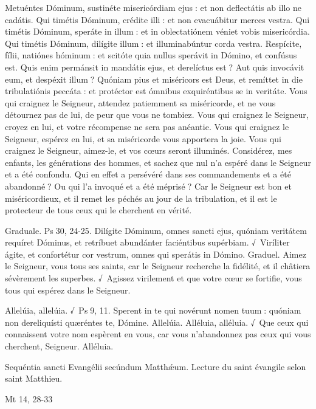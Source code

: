 \begin{paracol}{2}
Metuéntes Dóminum, sustinéte  misericórdiam ejus : et non deflectátis ab illo ne cadátis. Qui timétis Dóminum, crédite illi : et non evacuábitur merces vestra. Qui timétis Dóminum, speráte in illum : et in oblectatiónem véniet vobis misericórdia. Qui timétis Dóminum, dilígite illum : et illuminabúntur corda vestra. Respícite, fílii, natiónes hóminum : et scitóte quia nullus sperávit in Dómino, et confúsus est. Quis enim permánsit in mandátis ejus, et derelíctus est ? Aut quis invocávit eum, et despéxit illum ? Quóniam pius et miséricors est Deus, et remíttet in die tribulatiónis peccáta : et protéctor est ómnibus exquiréntibus se in veritáte.
\switchcolumn
Vous qui craignez le Seigneur,  attendez patiemment sa miséricorde, et ne vous détournez pas de lui, de peur que vous ne tombiez. Vous qui craignez le Seigneur, croyez en lui, et votre récompense ne sera pas anéantie. Vous qui craignez le Seigneur, espérez en lui, et sa miséricorde vous apportera la joie. Vous qui craignez le Seigneur, aimez-le, et vos cœurs seront illuminés. Considérez, mes enfants, les générations des hommes, et sachez que nul n’a espéré dans le Seigneur et a été confondu. Qui en effet a persévéré dans ses commandements et a été abandonné ? Ou qui l’a invoqué et a été méprisé ? Car le Seigneur est bon et miséricordieux, et il remet les péchés au jour de la tribulation, et il est le protecteur de tous ceux qui le cherchent en vérité.
\switchcolumn*

Graduale. Ps 30, 24-25. Dilígite Dóminum, omnes sancti ejus, quóniam veritátem requíret Dóminus, et retríbuet abundánter faciéntibus supérbiam. √~Viríliter ágite, et confortétur cor vestrum, omnes qui sperátis in Dómino.
\switchcolumn
Graduel. Aimez le Seigneur, vous tous ses saints, car le Seigneur recherche la fidélité, et il châtiera sévèrement les superbes. √~Agissez virilement et que votre cœur se fortifie, vous tous qui espérez dans le Seigneur.
\switchcolumn*

Allelúia, allelúia. √~Ps 9, 11. Sperent in te qui novérunt nomen tuum : quóniam non dereliquísti quæréntes te, Dómine. Allelúia.
\switchcolumn
Alléluia, alléluia. √~Que ceux qui connaissent votre nom espèrent en vous, car vous n’abandonnez pas ceux qui vous cherchent, Seigneur. Alléluia.
\switchcolumn*

Sequéntia sancti Evangélii secúndum Matthǽum.
\switchcolumn
Lecture du saint évangile selon saint Matthieu.
\switchcolumn*

Mt 14, 28-33
\switchcolumn

\switchcolumn*


\end{paracol}
